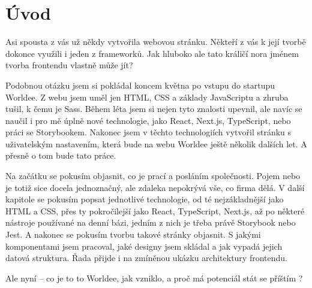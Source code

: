 \chapter*{Úvod}

Asi spousta z vás už někdy vytvořila webovou stránku. Někteří z vás k její tvorbě dokonce využili i jeden z frameworků. Jak hluboko ale tato králičí nora jménem tvorba frontendu vlastně může jít?

Podobnou otázku jsem si pokládal koncem května po vstupu do startupu Worldee. Z webu jsem uměl jen HTML, CSS a základy JavaScriptu a zhruba tušil, k čemu je Sass. Během léta jsem si nejen tyto znalosti upevnil, ale navíc se naučil i pro mě úplně nové technologie, jako React, Next.js, TypeScript, nebo práci se Storybookem. Nakonec jsem v těchto technologiích vytvořil stránku s uživatelským nastavením, která bude na webu Worldee ještě několik dalších let. A přesně o tom bude tato práce.

Na začátku se pokusím objasnit, co je prací a posláním společnosti. Pojem  nebo  je totiž sice docela jednoznačný, ale zdaleka nepokrývá vše, co firma dělá. V další kapitole se pokusím popsat jednotlivé technologie, od té nejzákladnější jako HTML a CSS, přes ty pokročilejší jako React, TypeScript, Next.js, až po některé nástroje používané na denní bázi, jedním z nich je třeba právě Storybook nebo Jest. A nakonec se pokusím tvorbu takové stránky objasnit. S jakými komponentami jsem pracoval, jaké designy jsem skládal a jak vypadá jejich datová struktura. Řada přijde i na zmíněnou ukázku architektury frontendu.

Ale nyní – co je to to Worldee, jak vzniklo, a proč má potenciál stát se příštím ?